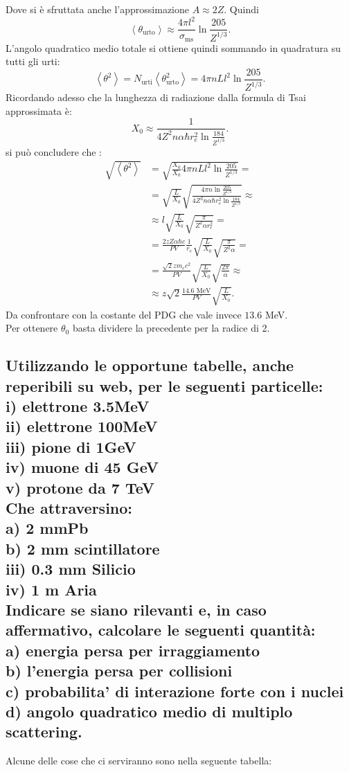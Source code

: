 Dove si è sfruttata anche l'approssimazione $A \approx 2Z$.
Quindi \[
	\left<\theta_{\text{urto}} \right> \approx \frac{4\pi l^2}{\sigma_{\text{ms}}} \ln \frac{205}{Z^{1/3}}
.\] 
L'angolo quadratico medio totale si ottiene quindi sommando in quadratura su tutti gli urti:
\[
	\left< \theta^2 \right> = N_{\text{urti}} \left<\theta^2_{\text{urto}} \right> = 4\pi nL l^2 \ln \frac{205}{Z^{1 /3}} 
.\] 
Ricordando adesso che la lunghezza di radiazione dalla formula di Tsai approssimata è:
\[
	X_0 \approx \frac{1}{4Z^2 n \alpha \hbar r_e^2 \ln \frac{184}{Z^{1 /3}}}
.\] 
si può concludere che :
\begin{align*}
	\sqrt{\left<\theta^2 \right>} &= \sqrt{\frac{X_0}{X_0} 4\pi nL l^2 \ln \frac{205}{Z^{1 /3}}} =\\
	&=  \sqrt{\frac{L}{X_0}} \sqrt{ \frac{4\pi n \ln \frac{205}{Z^{1 /3}} }{4Z^2 n \alpha \hbar r_e^2 \ln \frac{184}{Z^{1 /3}}} } \approx \\ 
	&\approx l \sqrt{\frac{L}{X_0}} \sqrt{\frac{\pi}{Z^2\alpha r_e^2}}=\\
	&= \frac{2zZ \alpha \hbar c}{PV}\frac{1}{r_e}\sqrt{\frac{L}{X_0}} \sqrt{\frac{\pi}{Z^2 \alpha}}=\\
	&= \frac{\sqrt{2} z m_e c^2}{PV} \sqrt{\frac{L}{X_0}} \sqrt{\frac{2\pi}{\alpha}} \approx \\
	&\approx z \sqrt{2} \frac{14.6 \text{ MeV}}{PV}\sqrt{\frac{L}{X_0}} 
.\end{align*}
Da confrontare con la costante del PDG che vale invece $13.6$ MeV.\\
Per ottenere $\theta_0$ basta dividere la precedente per la radice di 2.

\subsection[]{Utilizzando le opportune tabelle, anche reperibili su web, per le seguenti particelle: \\
i) elettrone 3.5MeV \\
ii) elettrone 100MeV \\
iii) pione di 1GeV \\
iv) muone di 45 GeV \\
v) protone da 7 TeV\\
Che attraversino:\\
a) 2 mmPb\\
b) 2 mm scintillatore\\
iii) 0.3 mm Silicio\\
iv) 1 m Aria\\
Indicare se siano rilevanti e, in caso affermativo, calcolare le seguenti quantità: \\
a) energia persa per irraggiamento \\
b) l’energia persa per collisioni \\
c) probabilita' di interazione forte con i nuclei\\
d) angolo quadratico medio di multiplo scattering.
}
\label{sec:4.b.19}
Alcune delle cose che ci serviranno sono nella seguente tabella:

